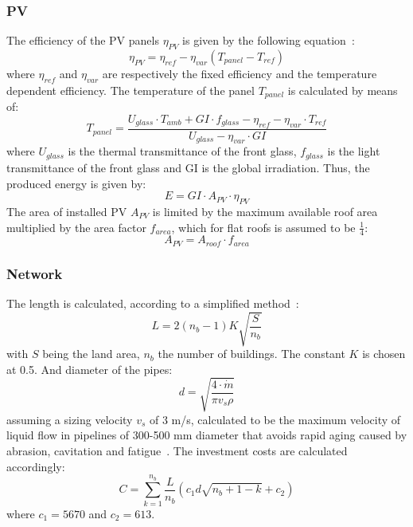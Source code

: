 \documentclass{article}
\begin{document}
\subsubsection{PV}
The efficiency of the PV panels $\eta_{PV}$ is given by the following equation~\cite{stadlerModelbasedOptimizationDistributed2016}:
\begin{equation}
	\eta_{PV} = \eta_{ref} - \eta_{var} (T_{panel}-T_{ref})
\end{equation}
where $\eta_{ref}$ and $\eta_{var}$ are respectively the fixed efficiency and the temperature dependent efficiency. The temperature of the panel $T_{panel}$ is calculated by means of:
\begin{equation}
	T_{panel} = \frac{U_{glass}\cdot T_{amb} + GI \cdot f_{glass}-\eta_{ref} - \eta_{var} \cdot T_{ref}}{U_{glass}-\eta_{var} \cdot GI}
\end{equation}
where $U_{glass}$ is the thermal transmittance of the front glass, $f_{glass}$ is the light transmittance of the front glass and GI is the global irradiation.
Thus, the produced energy is given by:
\begin{equation}
	E = GI \cdot A_{PV} \cdot  \eta_{PV}
\end{equation}
The area of installed PV $A_{PV}$ is limited by the maximum available roof area multiplied by the area factor $f_{area}$, which for flat roofs is assumed to be $\frac{1}{4}$:
\begin{equation}
	A_{PV} = A_{roof} \cdot f_{area}
\end{equation}


\subsubsection{Network}\label{sss:net}
The length is calculated, according to a simplified method~\cite{girardinEnerGisGeographicalInformation2010}:
\begin{equation}
L = 2(n_{b}-1)K\sqrt{\frac{S}{n_{b}}}
\end{equation}
with $S$ being the land area, $n_{b}$ the number of buildings. The constant $K$ is chosen at 0.5.
And diameter of the pipes:
\begin{equation}
d = \sqrt{\frac{4\cdot \dot{m}}{\pi v_{s} \rho}}
\end{equation}
assuming a sizing velocity $v_{s}$ of 3 m/s, calculated to be the maximum velocity of liquid flow in pipelines of 300-500 mm diameter that avoids rapid aging caused by abrasion, cavitation and fatigue~\cite{henchozPerformanceProfitabilityPerspectives2015}.
The investment costs are calculated accordingly:
\begin{equation}
C = \sum_{k=1}^{n_{b}} \frac{L}{n_{b}} (c_{1} d \sqrt{n_{b}+1-k} + c_{2})
\end{equation}
where $c_{1} =5670 $ and $c_{2} = 613 $.\\
\end{document}
